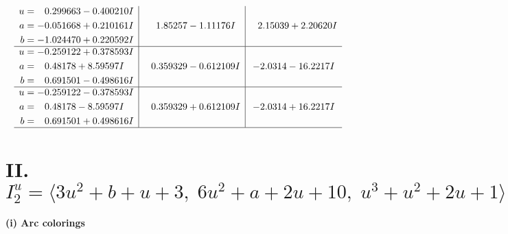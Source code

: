\documentclass[1p]{elsarticle_modified}
\theoremstyle{definition}
\begin{document}
$$\begin{array}{c|c|c}
\begin{aligned}
u &= \phantom{-}0.299663 - 0.400210 I \\
a &= -0.051668 + 0.210161 I \\
b &= -1.024470 + 0.220592 I\end{aligned}
 & \phantom{-}1.85257 - 1.11176 I & \phantom{-}2.15039 + 2.20620 I \\ \hline\begin{aligned}
u &= -0.259122 + 0.378593 I \\
a &= \phantom{-}0.48178 + 8.59597 I \\
b &= \phantom{-}0.691501 - 0.498616 I\end{aligned}
 & \phantom{-}0.359329 - 0.612109 I & -2.0314 - 16.2217 I \\ \hline\begin{aligned}
u &= -0.259122 - 0.378593 I \\
a &= \phantom{-}0.48178 - 8.59597 I \\
b &= \phantom{-}0.691501 + 0.498616 I\end{aligned}
 & \phantom{-}0.359329 + 0.612109 I & -2.0314 + 16.2217 I\\
 \hline 
 \end{array}$$\newpage\newpage\renewcommand{\arraystretch}{1}
\centering \section*{II. $I^u_{2}= \langle 3 u^2+b+u+3,\;6 u^2+a+2 u+10,\;u^3+u^2+2 u+1 \rangle$}
\flushleft \textbf{(i) Arc colorings}\\
\end{document}

